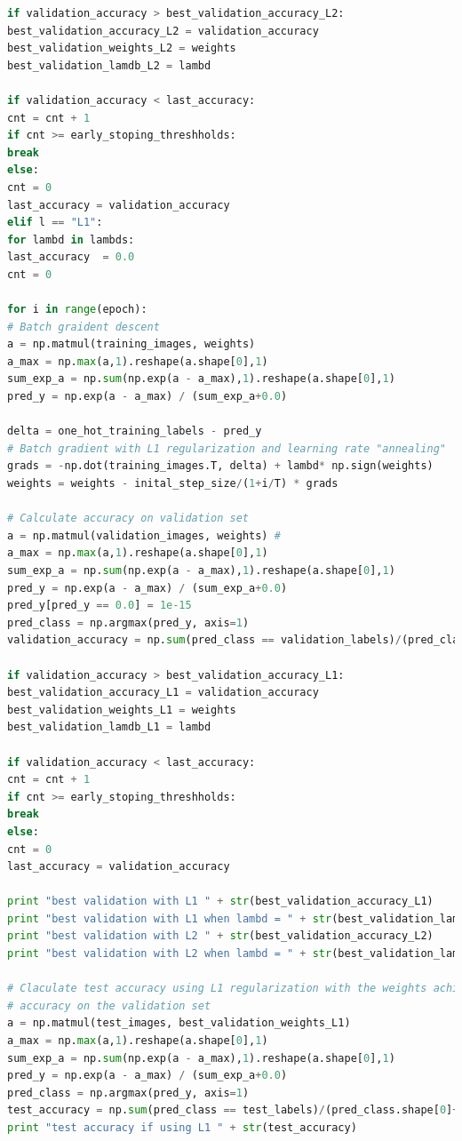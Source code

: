 \documentclass{article} %
\begin{document}
{\begin{lstlisting}[language=Python]
if validation_accuracy > best_validation_accuracy_L2:
best_validation_accuracy_L2 = validation_accuracy
best_validation_weights_L2 = weights
best_validation_lamdb_L2 = lambd

if validation_accuracy < last_accuracy:
cnt = cnt + 1
if cnt >= early_stoping_threshholds:
break
else:
cnt = 0
last_accuracy = validation_accuracy
elif l == "L1":
for lambd in lambds:
last_accuracy  = 0.0
cnt = 0

for i in range(epoch):
# Batch graident descent
a = np.matmul(training_images, weights)
a_max = np.max(a,1).reshape(a.shape[0],1)
sum_exp_a = np.sum(np.exp(a - a_max),1).reshape(a.shape[0],1)  
pred_y = np.exp(a - a_max) / (sum_exp_a+0.0) 

delta = one_hot_training_labels - pred_y 
# Batch gradient with L1 regularization and learning rate "annealing"
grads = -np.dot(training_images.T, delta) + lambd* np.sign(weights)
weights = weights - inital_step_size/(1+i/T) * grads

# Calculate accuracy on validation set
a = np.matmul(validation_images, weights) #
a_max = np.max(a,1).reshape(a.shape[0],1)
sum_exp_a = np.sum(np.exp(a - a_max),1).reshape(a.shape[0],1)
pred_y = np.exp(a - a_max) / (sum_exp_a+0.0) 
pred_y[pred_y == 0.0] = 1e-15       
pred_class = np.argmax(pred_y, axis=1)
validation_accuracy = np.sum(pred_class == validation_labels)/(pred_class.shape[0]+0.0)

if validation_accuracy > best_validation_accuracy_L1:
best_validation_accuracy_L1 = validation_accuracy
best_validation_weights_L1 = weights
best_validation_lamdb_L1 = lambd

if validation_accuracy < last_accuracy:
cnt = cnt + 1
if cnt >= early_stoping_threshholds:
break
else:
cnt = 0
last_accuracy = validation_accuracy

print "best validation with L1 " + str(best_validation_accuracy_L1)
print "best validation with L1 when lambd = " + str(best_validation_lamdb_L1)
print "best validation with L2 " + str(best_validation_accuracy_L2)
print "best validation with L2 when lambd = " + str(best_validation_lamdb_L2)

# Claculate test accuracy using L1 regularization with the weights achieve highest 
# accuracy on the validation set
a = np.matmul(test_images, best_validation_weights_L1) 
a_max = np.max(a,1).reshape(a.shape[0],1)
sum_exp_a = np.sum(np.exp(a - a_max),1).reshape(a.shape[0],1)
pred_y = np.exp(a - a_max) / (sum_exp_a+0.0) 
pred_class = np.argmax(pred_y, axis=1)
test_accuracy = np.sum(pred_class == test_labels)/(pred_class.shape[0]+0.0)
print "test accuracy if using L1 " + str(test_accuracy) 


\end{lstlisting}}
\end{document}
